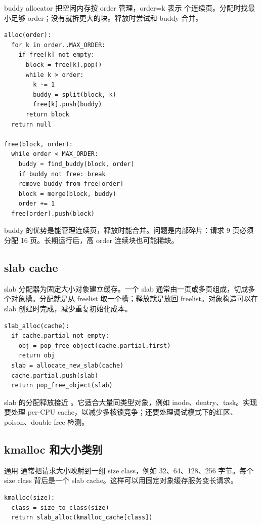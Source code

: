 buddy allocator 把空闲内存按 order 管理，order=k 表示  个连续页。分配时找最小足够 order；没有就拆更大的块。释放时尝试和 buddy 合并。

\begin{lstlisting}
alloc(order):
  for k in order..MAX_ORDER:
    if free[k] not empty:
      block = free[k].pop()
      while k > order:
        k -= 1
        buddy = split(block, k)
        free[k].push(buddy)
      return block
  return null

free(block, order):
  while order < MAX_ORDER:
    buddy = find_buddy(block, order)
    if buddy not free: break
    remove buddy from free[order]
    block = merge(block, buddy)
    order += 1
  free[order].push(block)
\end{lstlisting}

buddy 的优势是能管理连续页，释放时能合并。问题是内部碎片：请求 9 页必须分配 16 页。长期运行后，高 order 连续块也可能稀缺。

\subsection{slab cache}

slab 分配器为固定大小对象建立缓存。一个 slab 通常由一页或多页组成，切成多个对象槽。分配就是从 freelist 取一个槽；释放就是放回 freelist。对象构造可以在 slab 创建时完成，减少重复初始化成本。

\begin{lstlisting}
slab_alloc(cache):
  if cache.partial not empty:
    obj = pop_free_object(cache.partial.first)
    return obj
  slab = allocate_new_slab(cache)
  cache.partial.push(slab)
  return pop_free_object(slab)
\end{lstlisting}

slab 的分配释放接近 。它适合大量同类型对象，例如 inode、dentry、task。实现要处理 per-CPU cache，以减少多核锁竞争；还要处理调试模式下的红区、poison、double free 检测。

\subsection{kmalloc 和大小类别}

通用  通常把请求大小映射到一组 size class，例如 32、64、128、256 字节。每个 size class 背后是一个 slab cache。这样可以用固定对象缓存服务变长请求。

\begin{lstlisting}
kmalloc(size):
  class = size_to_class(size)
  return slab_alloc(kmalloc_cache[class])
\end{lstlisting}

